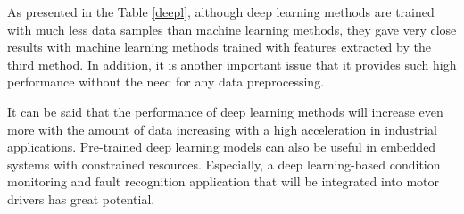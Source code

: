 As presented in the Table \ref{deepl}, although deep learning methods are trained with much less data samples than machine learning methods, they gave very close results with machine learning methods trained with features extracted by the third method. In addition, it is another important issue that it provides such high performance without the need for any data preprocessing.

It can be said that the performance of deep learning methods will increase even more with the amount of data increasing with a high acceleration in industrial applications. Pre-trained deep learning models can also be useful in embedded systems with constrained resources. Especially, a deep learning-based condition monitoring and fault recognition application that will be integrated into motor drivers has great potential.